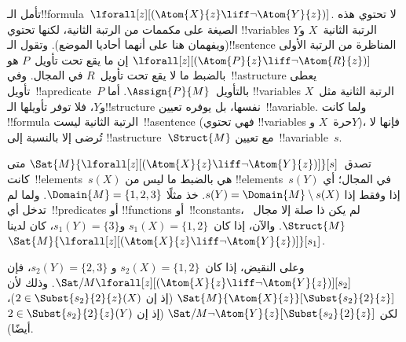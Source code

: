 \documentclass[../../../include/open-logic-section]{subfiles}
\begin{document}
\begin{ex}
  تأمل الـ!!{formula}~$\lforall[z][(\Atom{X}{z} \liff \lnot
    \Atom{Y}{z})]$. لا تحتوي هذه الصيغة على مكممات من الرتبة الثانية،
  لكنها تحتوي !!{variable}s الرتبة الثانية~$X$ و$Y$ (ويفهمان هنا على
  أنهما أحاديا الموضع). وتقول الـ!!{sentence} المناظرة من الرتبة الأولى
  $\lforall[z][(\Atom{P}{z} \liff \lnot \Atom{R}{z})]$ إن ما يقع
  تحت تأويل~$P$ هو بالضبط ما لا يقع تحت تأويل~$R$ في المجال. وفي~!!a{structure} يعطى
  تأويل~!!a{predicate}~$P$ بالتأويل~$\Assign{P}{M}$. أما
  !!{variable}s الرتبة الثانية مثل~$X$ و$Y$، فلا توفر تأويلها
  الـ!!{structure} نفسها، بل يوفره تعيين~!!a{variable}. ولما كانت
  !!{formula} الرتبة الثانية ليست~!!a{sentence} (فهي تحتوي
  !!{variable}s حرة~$X$ و$Y$)، فإنها لا تُرضى إلا بالنسبة إلى
  !!a{structure}~$\Struct{M}$ مع تعيين~!!a{variable}~$s$.

  تصدق~$\Sat{M}{\lforall[z][(\Atom{X}{z} \liff \lnot
    \Atom{Y}{z})]}[s]$ متى كانت~!!{element}s~$s(X)$ هي بالضبط ما ليس من
  !!{element}s~$s(Y)$ في المجال؛ أي إذا وفقط إذا
  $s(Y) = \Domain{M} \setminus s(X)$. خذ مثلًا
  $\Domain{M} = \{1, 2, 3\}$. ولما لم تدخل أي~!!{predicate}s أو
  !!{function}s أو~!!{constant}s، لم يكن ذا صلة إلا مجال~$\Struct{M}$.
  والآن، إذا كان~$s_1(X) = \{1, 2\}$ و$s_1(Y) = \{3\}$، كان لدينا
  $\Sat{M}{\lforall[z][(\Atom{X}{z}
      \liff \lnot \Atom{Y}{z})]}[s_1]$.

  وعلى النقيض، إذا كان~$s_2(X) = \{1, 2\}$ و
  $s_2(Y) = \{2, 3\}$، فإن
  $\Sat/{M}{\lforall[z][(\Atom{X}{z} \liff \lnot
      \Atom{Y}{z})]}[s_2]$. وذلك لأن
  $\Sat{M}{\Atom{X}{z}}[\Subst{s_2}{2}{z}]$ (إذ إن
  $2 \in \Subst{s_2}{2}{z}(X)$)، لكن
  $\Sat/{M}{\lnot \Atom{Y}{z}}[\Subst{s_2}{2}{z}]$ (إذ إن
  $2 \in \Subst{s_2}{2}{z}(Y)$ أيضًا).
\end{ex}
\end{document}
